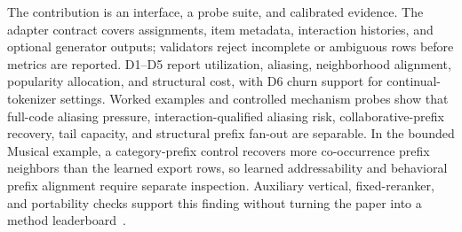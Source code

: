 The contribution is an interface, a probe suite, and calibrated evidence. The
adapter contract covers \sid assignments, item metadata, interaction histories,
and optional generator outputs; validators reject incomplete or ambiguous rows
before metrics are reported. D1--D5 report utilization, aliasing, neighborhood
alignment, popularity allocation, and structural cost, with D6 churn support
for continual-tokenizer settings. Worked examples and controlled mechanism
probes show that full-code aliasing pressure, interaction-qualified aliasing
risk, collaborative-prefix recovery, tail capacity, and structural prefix
fan-out are separable. In the bounded Musical example, a category-prefix
control recovers more co-occurrence prefix neighbors than the learned export
rows, so learned addressability and behavioral prefix alignment require
separate inspection. Auxiliary vertical, fixed-reranker, and portability checks
support this finding without turning the paper into a method
leaderboard~\cite{cikm2026resource}.
